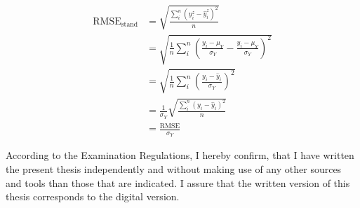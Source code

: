 \documentclass{article}
\begin{document}

\begin{equation}\label{eq:deriv_stand_rmse}
\begin{aligned}
    \text{RMSE}_{\text{stand}} &= \sqrt{\frac{\sum_i^n (y^z_i - \hat{y}^z_i)^2}{n}}\\
    &= \sqrt{\frac{1}{n}\sum_i^n \left(\frac{y_i - \mu_Y}{\sigma_Y} - \frac{\hat{y}_i - \mu_Y}{\sigma_Y}\right)^2}\\
    &= \sqrt{\frac{1}{n}\sum_i^n \left(\frac{y_i  - \hat{y}_i}{\sigma_Y}\right)^2}\\
    &= \frac{1}{\sigma_Y}\sqrt{\frac{\sum_i^n (y_i  - \hat{y}_i)^2}{n}}\\
    &= \frac{\text{RMSE}}{\sigma_Y}
\end{aligned}
\end{equation}

\clearpage

According to the Examination Regulations, I hereby confirm, that I have written the present thesis independently and without making use of any other sources and
 tools than those that are indicated. I assure that the written version of this thesis corresponds to the digital version.
\end{document}
